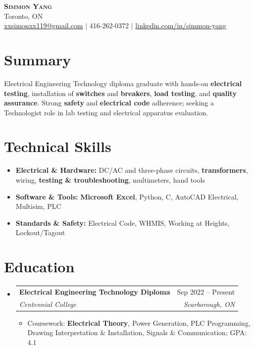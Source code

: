 \documentclass[letterpaper,11pt]{article}
\makeatletter
\newcommand{\resumeItem}[1]{\item\small{{#1 \vspace{-2pt}}}}
\newcommand{\resumeSubheading}[4]{
  \vspace{-2pt}\item
    \begin{tabular*}{0.97\textwidth}[t]{l@{\extracolsep{\fill}}r}
      \textbf{#1} & #2 \\
      \textit{\small #3} & \textit{\small #4} \\
    \end{tabular*}\vspace{-7pt}
}
\newcommand{\resumeSubHeadingListStart}{\begin{itemize}[leftmargin=0.15in, label={}]}
\newcommand{\resumeSubHeadingListEnd}{\end{itemize}}
\newcommand{\resumeItemListStart}{\begin{itemize}}
\newcommand{\resumeItemListEnd}{\end{itemize}\vspace{-5pt}}
\makeatother
\begin{document}
\begin{center}
    \textbf{\Huge \scshape Simmon Yang} \\ \vspace{1pt}
    Toronto, ON \\ 
    \href{mailto:xxsimonxx119@gmail.com}{xxsimonxx119@gmail.com} $|$ 416-262-0372 $|$ 
    \href{https://www.linkedin.com/in/simmon-yang/}{linkedin.com/in/simmon-yang}
\end{center}

\section{Summary}
Electrical Engineering Technology diploma graduate with hands-on \textbf{electrical testing}, installation of \textbf{switches} and \textbf{breakers}, \textbf{load testing}, and \textbf{quality assurance}. Strong \textbf{safety} and \textbf{electrical code} adherence; seeking a Technologist role in lab testing and electrical apparatus evaluation.

\section{Technical Skills}
\begin{itemize}[leftmargin=0.15in]
  \item \textbf{Electrical \& Hardware:} DC/AC and three-phase circuits, \textbf{transformers}, wiring, \textbf{testing \& troubleshooting}, multimeters, hand tools
  \item \textbf{Software \& Tools:} \textbf{Microsoft Excel}, Python, C, AutoCAD Electrical, Multisim, PLC
  \item \textbf{Standards \& Safety:} Electrical Code, WHMIS, Working at Heights, Lockout/Tagout
\end{itemize}

\section{Education}
\resumeSubHeadingListStart
\resumeSubheading
  {Electrical Engineering Technology Diploma}{Sep 2022 -- Present}
  {Centennial College}{Scarborough, ON}
\resumeItemListStart
  \resumeItem{Coursework: \textbf{Electrical Theory}, Power Generation, PLC Programming, Drawing Interpretation \& Installation, Signals \& Communication; GPA: 4.1}
\resumeItemListEnd
\resumeSubHeadingListEnd
\end{document}
